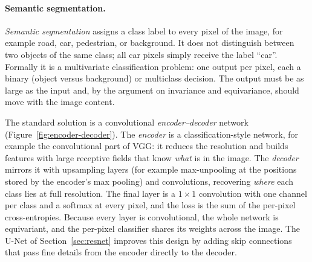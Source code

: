 \paragraph{Semantic segmentation.}
\emph{Semantic segmentation} assigns a class label to every pixel of the image,
for example road, car, pedestrian, or background. It does not distinguish
between two objects of the same class; all car pixels simply receive the label
``car''. Formally it is a multivariate classification problem: one output per
pixel, each a binary (object versus background) or multiclass decision. The
output must be as large as the input and, by the argument on invariance and
equivariance, should move with the image content.

The standard solution is a convolutional \emph{encoder--decoder} network
(Figure~\ref{fig:encoder-decoder}). The \emph{encoder} is a classification-style
network, for example the convolutional part of VGG: it reduces the resolution
and builds features with large receptive fields that know \emph{what} is in the
image. The \emph{decoder} mirrors it with upsampling layers (for example
max-unpooling at the positions stored by the encoder's max pooling) and
convolutions, recovering \emph{where} each class lies at full resolution. The
final layer is a $1\times1$ convolution with one channel per class and a softmax
at every pixel, and the loss is the sum of the per-pixel cross-entropies.
Because every layer is convolutional, the whole network is equivariant, and the
per-pixel classifier shares its weights across the image. The U-Net of
Section~\ref{sec:resnet} improves this design by adding skip connections that pass fine details
from the encoder directly to the decoder.

